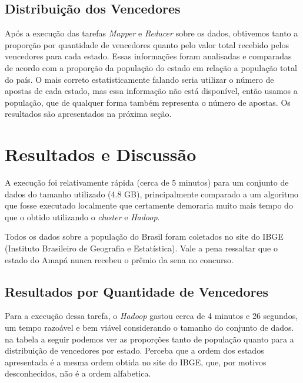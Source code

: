 \documentclass[a4paper,10pt]{article}
\begin{document}
\subsection{Distribuição dos Vencedores}
Após a execução das tarefas \textit{Mapper} e \textit{Reducer} sobre os dados, obtivemos tanto a proporção por quantidade de vencedores quanto pelo valor total recebido pelos vencedores para cada estado. Essas informações foram analisadas e comparadas de acordo com a proporção da população do estado em relação a população total do país. O mais correto estatisticamente falando seria utilizar o número de apostas de cada estado, mas essa informação não está disponível, então usamos a população, que de qualquer forma também representa o número de apostas. Os resultados são apresentados na próxima seção.


\section{Resultados e Discussão}
A execução foi relativamente rápida (cerca de 5 minutos) para um conjunto de dados do tamanho utilizado (4.8 GB), principalmente comparado a um algoritmo que fosse executado localmente que certamente demoraria muito mais tempo do que o obtido utilizando o \textit{cluster} e \textit{Hadoop}.

Todos os dados sobre a população do Brasil foram coletados no site do IBGE (Instituto Brasileiro de Geografia e Estatística)\cite{ibge}. Vale a pena ressaltar que o estado do Amapá nunca recebeu o prêmio da sena no concurso.

\subsection{Resultados por Quantidade de Vencedores}
Para a execução dessa tarefa, o \textit{Hadoop} gastou cerca de 4 minutos e 26 segundos, um tempo razoável e bem viável considerando o tamanho do conjunto de dados. na tabela a seguir podemos ver as proporções tanto de população quanto para a distribuição de vencedores por estado. Perceba que a ordem dos estados apresentada é a mesma ordem obtida no site do IBGE\cite{ibge}, que, por motivos desconhecidos, não é a ordem alfabetica.
\end{document}
